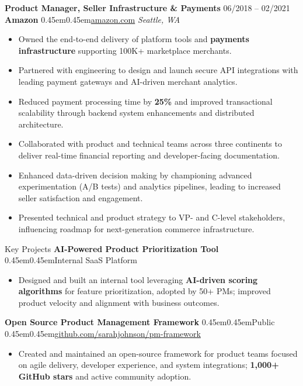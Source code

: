 \documentclass[10pt, letterpaper]{article}
\makeatletter
\renewcommand{\section}{%
  \@startsection{section}{1}{\z@}{10pt}{6pt}{%
    \Large\bfseries\color{black}%
  }%
}
\newcommand{\bull}{\kern0.45em\textbullet\kern0.45em}
\newcommand{\role}[1]{\textbf{#1}}
\newcommand{\org}[1]{\textbf{#1}}
\newcommand{\place}[1]{\textit{#1}}
\makeatother
\begin{document}
\role{Product Manager, Seller Infrastructure \& Payments} \hfill 06/2018 -- 02/2021 \\
\org{Amazon} \bull \href{https://amazon.com}{amazon.com} \hfill \place{Seattle, WA}
\begin{itemize}
  \item Owned the end-to-end delivery of platform tools and \textbf{payments infrastructure} supporting 100K+ marketplace merchants.
  \item Partnered with engineering to design and launch secure API integrations with leading payment gateways and AI-driven merchant analytics.
  \item Reduced payment processing time by \textbf{25\%} and improved transactional scalability through backend system enhancements and distributed architecture.
  \item Collaborated with product and technical teams across three continents to deliver real-time financial reporting and developer-facing documentation.
  \item Enhanced data-driven decision making by championing advanced experimentation (A/B tests) and analytics pipelines, leading to increased seller satisfaction and engagement.
  \item Presented technical and product strategy to VP- and C-level stakeholders, influencing roadmap for next-generation commerce infrastructure.
\end{itemize}
\vspace{12pt}

\section{Key Projects}
\org{AI-Powered Product Prioritization Tool} \bull Internal SaaS Platform
\begin{itemize}
  \item Designed and built an internal tool leveraging \textbf{AI-driven scoring algorithms} for feature prioritization, adopted by 50+ PMs; improved product velocity and alignment with business outcomes.
\end{itemize}

\org{Open Source Product Management Framework} \bull Public \bull \href{https://github.com/sarahjohnson/pm-framework}{github.com/sarahjohnson/pm-framework}
\begin{itemize}
  \item Created and maintained an open-source framework for product teams focused on agile delivery, developer experience, and system integrations; \textbf{1,000+ GitHub stars} and active community adoption.
\end{itemize}
\end{document}
